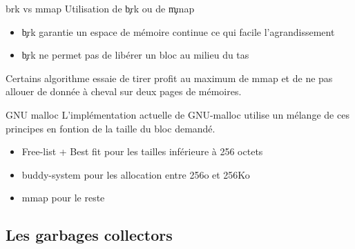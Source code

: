 \begin{frame}[fragile=singleslide]{brk vs mmap}
  Utilisation de \c{brk} ou de \c{mmap}
  \begin{itemize}
  \item \c{brk} garantie  un espace de mémoire continue  ce qui facile
    l'agrandissement
  \item \c{brk} ne permet pas de libérer un bloc au milieu du tas
  \end{itemize}
  Certains algorithme essaie de tirer  profit au maximum de mmap et de
  ne pas allouer de donnée à cheval sur deux pages de mémoires.
\end{frame}

\begin{frame}[fragile=singleslide]{GNU malloc}
  L'implémentation actuelle de  GNU-malloc utilise un mélange de
  ces principes en fontion de la taille du bloc demandé.
  \begin{itemize}
  \item Free-list + Best fit pour les tailles inférieure à 256 octets
  \item buddy-system pour les allocation entre 256o et 256Ko
  \item mmap pour le reste
  \end{itemize}
\end{frame}

\subsection{Les garbages collectors}

